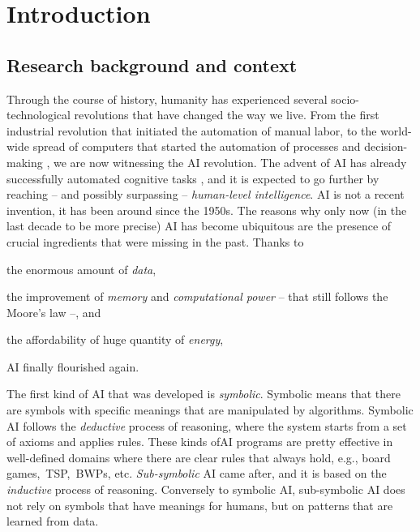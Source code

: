 
\chapter{Introduction}
\label{ch:introduction}
\mtcaddchapter
\minitoc

\begin{refsection}

\section{Research background and context}\label{sec:research-background-and-context}
%
Through the course of history, humanity has experienced several socio-technological revolutions that have changed the way we live.
%
From the first industrial revolution that initiated the automation of manual labor, to the world-wide spread of computers that started the automation of processes and decision-making , we are now witnessing the \ac{AI} revolution.
%
The advent of \ac{AI} has already successfully automated cognitive tasks , and it is expected to go further by reaching -- and possibly surpassing -- \emph{human-level intelligence}.
%
\Ac{AI} is not a recent invention, it has been around since the 1950s.
%
The reasons why only now (in the last decade to be more precise) \ac{AI} has become ubiquitous are the presence of crucial ingredients that were missing in the past.
%
Thanks to
%
\begin{inlinelist}
    \item the enormous amount of \emph{data},
    \item the improvement of \emph{memory} and \emph{computational power} -- that still follows the Moore's law --, and
    \item the affordability of huge quantity of \emph{energy},
\end{inlinelist}
%
\ac{AI} finally flourished again.

The first kind of \ac{AI} that was developed is \emph{symbolic}.
%
Symbolic means that there are symbols with specific meanings that are manipulated by algorithms.
%
Symbolic \ac{AI} follows the \emph{deductive} process of reasoning, where the system starts from a set of axioms and applies rules.
%
These kinds of\ac{AI} programs are pretty effective in well-defined domains where there are clear rules that always hold, e.g., board games,~\ac{TSP},~\acp{BWP}, etc.
%
\emph{Sub-symbolic} \ac{AI} came after, and it is based on the \emph{inductive} process of reasoning.
%
Conversely to symbolic \ac{AI}, sub-symbolic \ac{AI} does not rely on symbols that have meanings for humans, but on patterns that are learned from data.
%



\end{refsection}
